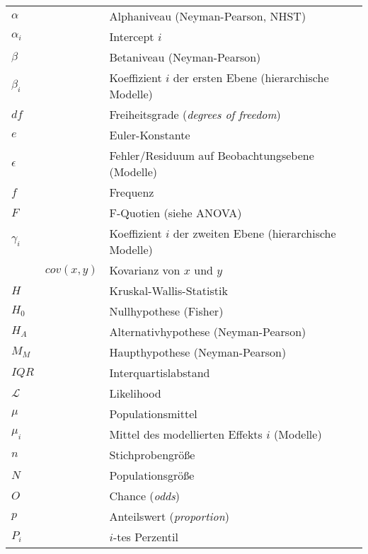 \begin{longtable}{p{}p{}p{}}
  $\alpha$          &              & Alphaniveau (Neyman-Pearson, NHST) \\
  $\alpha_i$        &              & Intercept $i$ \\
  $\beta$           &              & Betaniveau (Neyman-Pearson) \\
  $\beta_i$         &              & Koeffizient $i$ der ersten Ebene (hierarchische Modelle) \\
  $df$              &              & Freiheitsgrade (\textit{degrees of freedom}) \\
  $e$               &              & Euler-Konstante \\
  $\epsilon$        &              & Fehler/Residuum auf Beobachtungsebene (Modelle) \\
  $f$               &              & Frequenz \\
  $F$               &              & F-Quotien (siehe ANOVA)\\
  $\gamma_i$        &              & Koeffizient $i$ der zweiten Ebene (hierarchische Modelle)  \\
                    & $cov(x, y)$  & Kovarianz von $x$ und $y$ \\
  $H$               &              & Kruskal-Wallis-Statistik \\
  $H_0$             &              & Nullhypothese (Fisher) \\
  $H_A$             &              & Alternativhypothese (Neyman-Pearson) \\
  $M_M$             &              & Haupthypothese  (Neyman-Pearson) \\
  $IQR$             &              & Interquartislabstand \\
  $\mathcal{L}$     &              & Likelihood \\
  $\mu$             &              & Populationsmittel \\
  $\mu_i$           &              & Mittel des modellierten Effekts $i$ (Modelle) \\
  $n$               &              & Stichprobengröße \\
  $N$               &              & Populationsgröße \\
  $O$               &              & Chance (\textit{odds}) \\
  $p$               &              & Anteilswert (\textit{proportion}) \\
  $P_i$             &              & $i$-tes Perzentil \\

\end{longtable}
